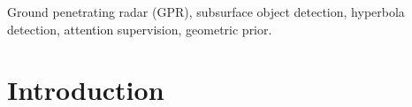 \documentclass[lettersize,journal]{IEEEtran}
\begin{document}
\begin{IEEEkeywords}
Ground penetrating radar (GPR), subsurface object detection, hyperbola detection, attention supervision, geometric prior. 

\end{IEEEkeywords}

\section{Introduction}





\end{document}
